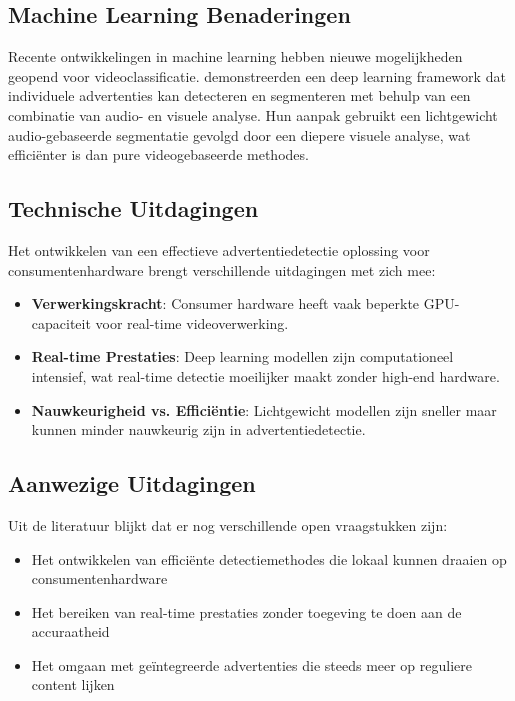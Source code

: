 \subsection{Machine Learning Benaderingen}
Recente ontwikkelingen in machine learning hebben nieuwe mogelijkheden geopend voor videoclassificatie. \textcite{Liu2023} demonstreerden een deep learning framework dat individuele advertenties kan detecteren en segmenteren met behulp van een combinatie van audio- en visuele analyse. Hun aanpak gebruikt een lichtgewicht audio-gebaseerde segmentatie gevolgd door een diepere visuele analyse, wat efficiënter is dan pure videogebaseerde methodes.

\subsection{Technische Uitdagingen}
Het ontwikkelen van een effectieve advertentiedetectie oplossing voor consumentenhardware brengt verschillende uitdagingen met zich mee:

\begin{itemize}
    \item \textbf{Verwerkingskracht}: Consumer hardware heeft vaak beperkte GPU-capaciteit voor real-time videoverwerking.
    \item \textbf{Real-time Prestaties}: Deep learning modellen zijn computationeel intensief, wat real-time detectie moeilijker maakt zonder high-end hardware.
    \item \textbf{Nauwkeurigheid vs. Efficiëntie}: Lichtgewicht modellen zijn sneller maar kunnen minder nauwkeurig zijn in advertentiedetectie.
\end{itemize}

\subsection{Aanwezige Uitdagingen}
Uit de literatuur blijkt dat er nog verschillende open vraagstukken zijn:

\begin{itemize}
    \item Het ontwikkelen van efficiënte detectiemethodes die lokaal kunnen draaien op consumentenhardware
    \item Het bereiken van real-time prestaties zonder toegeving te doen aan de accuraatheid
    \item Het omgaan met geïntegreerde advertenties die steeds meer op reguliere content lijken
\end{itemize}

